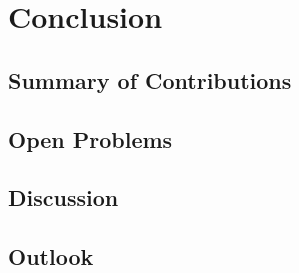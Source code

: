 \chapter{Conclusion}
\label{chap:extro}

\section{Summary of Contributions}

\section{Open Problems}

\section{Discussion}

\section{Outlook}
